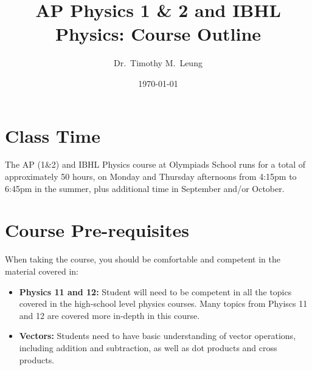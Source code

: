 \documentclass{../../oss-handout}
\title{AP Physics 1 \& 2 and IBHL Physics: Course Outline}
\author{Dr.\ Timothy M.\ Leung}
\date{\today}
\begin{document}
\thispagestyle{title}
\gentitle

\section*{Class Time}
The AP (1\&2) and IBHL Physics course at Olympiads School runs for a total of
approximately 50 hours, on Monday and Thursday afternoons  from 4:15pm to
6:45pm in the summer, plus additional time in September and/or October.

\section*{Course Pre-requisites}
When taking the course, you should be comfortable and competent in the material
covered in:
\begin{itemize}[nosep]
\item\textbf{Physics 11 and 12:} Student will need to be competent in all the
  topics covered in the high-school level physics courses. Many topics from
  Phyiscs 11 and 12 are covered more in-depth in this course.
\item\textbf{Vectors:} Students need to have basic understanding of vector
  operations, including addition and subtraction, as well as dot products and
  cross products.
\end{itemize}
\end{document}
